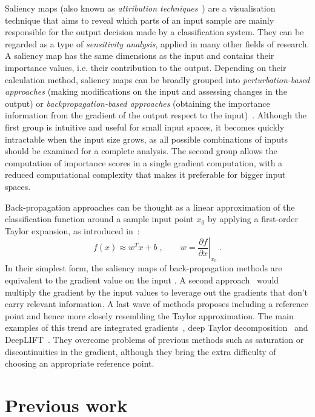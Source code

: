 \documentclass{article}
\begin{document}
Saliency maps (also known as \textit{attribution techniques}~\cite{Olah2017}) are a visualisation technique that aims to reveal which parts of an input sample are mainly responsible for the output decision made by a classification system.
They can be regarded as a type of \textit{sensitivity analysis}, applied in many other fields of research.
A saliency map has the same dimensions as the input and contains their importance values, i.e. their contribution to the output.
Depending on their calculation method, saliency maps can be broadly grouped into \textit{perturbation-based approaches} (making modifications on the input and assessing changes in the output) or \textit{backpropagation-based approaches} (obtaining the importance information from the gradient of the output respect to the input)~\cite{Shrikumar2017}.
Although the first group is intuitive and useful for small input spaces, it becomes quickly intractable when the input size grows, as all possible combinations of inputs should be examined for a complete analysis.
The second group allows the computation of importance scores in a single gradient computation, with a reduced computational complexity that makes it preferable for bigger input spaces.

Back-propagation approaches can be thought as a linear approximation of the classification function around a sample input point $x_0$ by applying a first-order Taylor expansion, as introduced in~\cite{Simonyan2014}:
\begin{equation*}
f(x) \approx w^T x + b \; , \qquad w = \left. \frac{\partial f}{\partial x} \right|_{x_0} \; .
\end{equation*}
In their simplest form, the saliency maps of back-propagation methods are equivalent to the gradient value on the input \cite{Simonyan2014}. A second approach~\cite{Bach2015} would multiply the gradient by the input values to leverage out the gradients that don't carry relevant information. A last wave of methods proposes including a reference point and hence more closely resembling the Taylor approximation. The main examples of this trend are integrated gradients~\cite{Sundararajan2017}, deep Taylor decomposition~\cite{Montavon2017} and DeepLIFT~\cite{Shrikumar2017}. They overcome problems of previous methods such as saturation or discontinuities in the gradient, although they bring the extra difficulty of choosing an appropriate reference point.

\section{Previous work}
\label{sec:prevwork}
\end{document}
